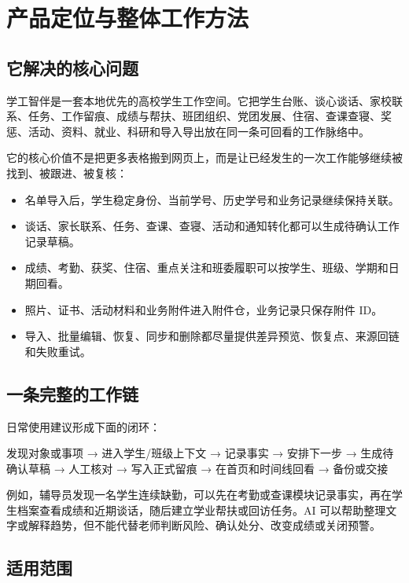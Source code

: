 \documentclass[UTF8,zihao=-4,oneside]{ctexrep}
\newcommand{\productname}{学工智伴}
\begin{document}
\tableofcontents
\clearpage
\listoffigures
\clearpage
{}

\chapter{产品定位与整体工作方法}

\section{它解决的核心问题}

\productname{}是一套本地优先的高校学生工作空间。它把学生台账、谈心谈话、家校联系、任务、工作留痕、成绩与帮扶、班团组织、党团发展、住宿、查课查寝、奖惩、活动、资料、就业、科研和导入导出放在同一条可回看的工作脉络中。

它的核心价值不是把更多表格搬到网页上，而是让已经发生的一次工作能够继续被找到、被跟进、被复核：

\begin{itemize}
  \item 名单导入后，学生稳定身份、当前学号、历史学号和业务记录继续保持关联。
  \item 谈话、家长联系、任务、查课、查寝、活动和通知转化都可以生成待确认工作记录草稿。
  \item 成绩、考勤、获奖、住宿、重点关注和班委履职可以按学生、班级、学期和日期回看。
  \item 照片、证书、活动材料和业务附件进入附件仓，业务记录只保存附件 ID。
  \item 导入、批量编辑、恢复、同步和删除都尽量提供差异预览、恢复点、来源回链和失败重试。
\end{itemize}

\section{一条完整的工作链}

日常使用建议形成下面的闭环：

\begin{workflowbox}
发现对象或事项 → 进入学生/班级上下文 → 记录事实 → 安排下一步 → 生成待确认草稿 → 人工核对 → 写入正式留痕 → 在首页和时间线回看 → 备份或交接
\end{workflowbox}

例如，辅导员发现一名学生连续缺勤，可以先在考勤或查课模块记录事实，再在学生档案查看成绩和近期谈话，随后建立学业帮扶或回访任务。AI 可以帮助整理文字或解释趋势，但不能代替老师判断风险、确认处分、改变成绩或关闭预警。

\section{适用范围}
\end{document}
